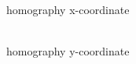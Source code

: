 \documentclass[12pt,a4paper,oneside,openright]{book}
\begin{document}
\begin{CJK}{UTF8}{}
\begin{figure}[htbp]
\begin{center}
\begin{minipage}[t]{.32\textwidth}
\begin{center}
        homography x-coordinate
      \end{center}
    \end{minipage}
    \begin{minipage}[t]{.32\textwidth}
      \begin{center}
        \\
        homography y-coordinate
      \end{center}
    \end{minipage}
    \begin{minipage}[t]{.32\textwidth}
      \begin{center}
        \\

\end{center}
\end{minipage}
\end{center}
\end{figure}
\end{CJK}
\end{document}
